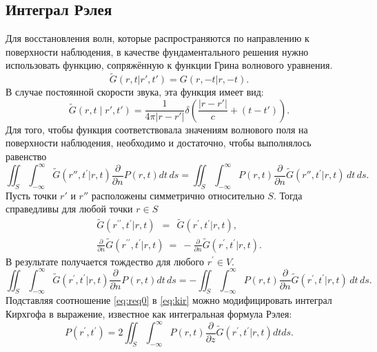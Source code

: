\documentclass[a4paper, fontsize=14pt]{article}
\begin{document}
	\subsection{Интеграл Рэлея}
	Для восстановления волн, которые распространяются по направлению к поверхности наблюдения, в качестве фундаментального решения нужно использовать функцию, сопряжённую к функции Грина волнового уравнения.
	\begin{equation}
	\widetilde{G}( r,t|r',t')=G(r,-t|r,-t).
	\end{equation}
	В случае постоянной скорости звука, эта функция имеет вид:
	\begin{equation}
	\widetilde{G}(r,t\mid r',t')=\frac{1}{4\pi\left|r-r'\right|}\delta\left(\frac{\left|r-r'\right|}{c}+(t-t')\right).
	\end{equation}
	Для того, чтобы функция соответствовала значениям волнового поля на поверхности наблюдения, необходимо и достаточно, чтобы выполнялось равенство
	\begin{equation}
	\iint_{S}\int_{-\infty}^{\infty}{\widetilde{G}}\left(r'',t^{\prime}|r,t\right){\frac{\partial}{\partial n}}P(r,t)d t\,d s = \iint_{S}\int_{-\infty}^{\infty}P(r,t){\frac{\partial}{\partial n}}{\widetilde{G}}\left(r'',t^{\prime}|r,t\right)\,d t\,d s.
	\end{equation}
	Пусть точки $r'$ и $r''$ расположены симметрично относительно $S$. Тогда справедливы для любой точки $r\in S$
	\begin{eqnarray}
		\widetilde{{{G}}}\left({r}^{\prime\prime},t^{\prime}|{r},t\right)~~=~~\widetilde{G}\left({r}^{\prime},t^{\prime}|{r},t\right), \\
		\frac{\partial}{\partial n}\widetilde G\left({ r}^{\prime\prime},t^{\prime}|{ r},t\right)~=~-\frac{\partial}{\partial n}\widetilde G\left({ r}^{\prime},t^{\prime}|{ r},t\right).
	\end{eqnarray}
	В результате получается тождество для любого ${ r}^{\prime}\in V$.
	\begin{equation}
	\iint_{S}\int_{-\infty}^{\infty}\widetilde{G}\left({r}^{\prime},t^{\prime}|{r},t\right)\frac{\partial}{\partial n}P({r},t)d t\,d s = -\iint_{S}\int_{-\infty}^{\infty}P({ r},t){\frac{\partial}{\partial n}}\widetilde{G}\left({ r}^{\prime},t^{\prime}|{ r},t\right)\,d t\,d s.
	\label{eq:req0}
	\end{equation}
Подставляя соотношение \eqref{eq:req0} в \eqref{eq:kir} можно модифицировать интеграл Кирхгофа в выражение, 
известное как интегральная формула Рэлея:
\begin{equation}
P({ r}^{\prime},t^{\prime})=2\iint_{S}\int_{-\infty}^{\infty}P({ r},t)\frac{\partial}{\partial z}\widetilde{G}\left({ r}^{\prime},t^{\prime}|{ r},t\right)d t d s.
\label{eq:rayleighorig}
\end{equation}
\end{document}
